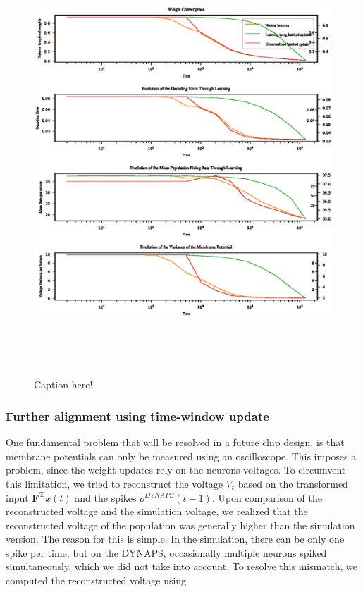 \documentclass[twoside,11pt]{article}
\begin{document}
\begin{figure}[!htb]
  \centering
  \includegraphics[width = \columnwidth, height=16cm]{figures/convergence_normal_vs_ub_vs_ub_nn.eps}
  \caption{Caption here!}
  \label{fig:batched_update}
\end{figure}

\subsubsection{Further alignment using time-window update}
One fundamental problem that will be resolved in a future chip design, is that
membrane potentials can only be measured using an oscilloscope. This imposes a problem, since
the weight updates rely on the neurons voltages.
To circumvent this limitation, we tried to
reconstruct the voltage $V_{t}$ based on the transformed input $\mathbf{F^T}x(t)$ and the
spikes $o^{DYNAPS}(t-1)$. Upon comparison of the reconstructed voltage and the simulation voltage,
we realized that the reconstructed voltage of the population was generally higher than the simulation
version. The reason for this is simple: In the simulation, there can be only one spike per time, but
on the DYNAPS, occasionally multiple neurons spiked simultaneously, which we did not take into account.
To resolve this mismatch, we computed the reconstructed voltage using
\end{document}
